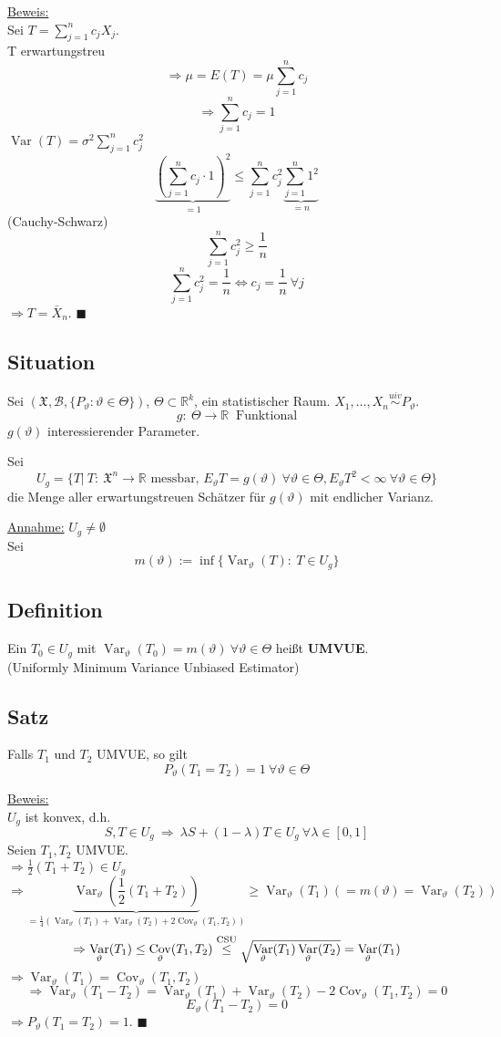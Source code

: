 \documentclass[a4paper,11pt,twoside,titlepage]{article}
\newcommand{\R}{{\mathbb R}}
\newcommand{\XX}{{\mathfrak X}} %
\newcommand\BB{ \mathcal{B} } %
\newcommand{\uiv}{\ensuremath{\stackrel{uiv}{\sim}}}
\DeclareMathOperator{\var}{Var}
\DeclareMathOperator{\cov}{Cov}
\begin{document}
\underline{Beweis:}\\
Sei $T=\sum\limits_{j=1}^n c_jX_j$.\\
T erwartungstreu \[\Rightarrow \mu=E(T)=\mu\sum_{j=1}^nc_j\]
\[\Rightarrow \sum_{j=1}^n c_j=1\]
$\var(T)=\sigma^2\sum\limits_{j=1}^n c_j^2$
\[\underbrace{\left(\sum_{j=1}^n c_j\cdot 1\right)^2}_{=1}\leq \sum_{j=1}^n c_j^2\underbrace{\sum_{j=1}^n 1^2}_{=n}\]
(Cauchy-Schwarz)
\[\sum_{j=1}^n c_j^2\geq\frac 1n\]
\[\sum_{j=1}^n c_j^2=\frac 1n \Leftrightarrow c_j=\frac1n\ \forall j\]
$\Rightarrow T=\bar X_n$. $\blacksquare$

\subsection{Situation}
Sei $(\XX,\BB,\{P_\vartheta: \vartheta\in\Theta\})$, $\Theta\subset\R^k$, ein statistischer Raum. $X_1,\ldots,X_n\uiv P_\vartheta$.
\[g:\ \Theta\to\R\ \mbox{ Funktional}\]
$g(\vartheta)$ interessierender Parameter.

Sei
\[U_g=\{T|\ T:\ \XX^n\to\R\mbox{ messbar, }E_\vartheta T=g(\vartheta)\ \forall\vartheta\in\Theta, E_\vartheta T^2<\infty\ \forall\vartheta\in\Theta\}\]
die Menge aller erwartungstreuen Schätzer für $g(\vartheta)$ mit endlicher Varianz.

\underline{Annahme:} $U_g\neq\emptyset$\\
Sei 
\[m(\vartheta):=\inf\{\var_\vartheta(T):\ T\in U_g\}\]

\subsection{Definition}
Ein $T_0\in U_g$ mit $\var_\vartheta(T_0)=m(\vartheta)\ \forall\vartheta\in\Theta$ heißt \textbf{UMVUE}.\\
(Uniformly Minimum Variance Unbiased Estimator)

\subsection{Satz}
Falls $T_1$ und $T_2$ UMVUE, so gilt 
\[P_\vartheta(T_1=T_2)=1\ \forall\vartheta\in\Theta\]

\underline{Beweis:}\\
$U_g$ ist konvex, d.h. 
\[S,T\in U_g\ \Rightarrow\ \lambda S+(1-\lambda)T\in U_g\ \forall\lambda\in[0,1]\]
Seien $T_1, T_2$ UMVUE.\\
$\Rightarrow \frac12(T_1+T_2)\in U_g$
\[\Rightarrow \underbrace{\var_\vartheta(\frac12(T_1+T_2))}_{=\frac14(\var_\vartheta(T_1)+\var_\vartheta(T_2)+2\cov_\vartheta(T_1,T_2))}\geq\var_\vartheta(T_1)(=m(\vartheta)=\var_\vartheta(T_2))\]
\[\Rightarrow \var_\vartheta(T_1)\leq\cov_\vartheta(T_1,T_2)\stackrel{\textnormal{CSU}}{\leq}\sqrt{\var_\vartheta(T_1)\var_\vartheta(T_2)}=\var_\vartheta(T_1)\]
$\Rightarrow \var_\vartheta(T_1)=\cov_\vartheta(T_1,T_2)$
\[\Rightarrow \var_\vartheta(T_1-T_2)=\var_\vartheta(T_1)+\var_\vartheta(T_2)-2\cov_\vartheta(T_1,T_2)=0\]
\[E_\vartheta(T_1-T_2)=0\]
$\Rightarrow P_\vartheta(T_1=T_2)=1$. $\blacksquare$
\end{document}
